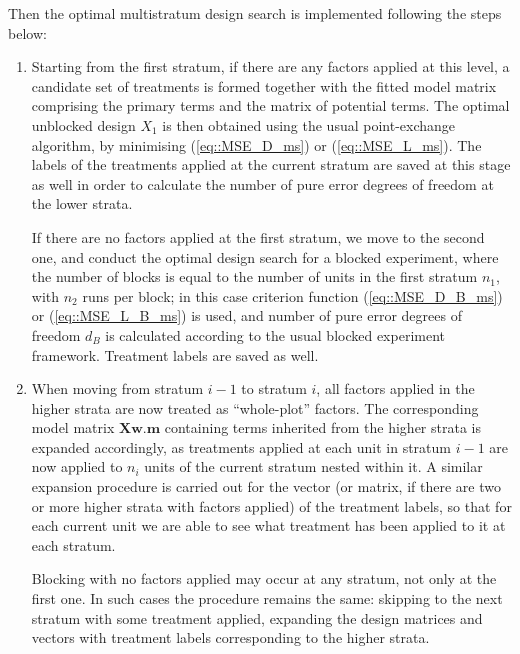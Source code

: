 
Then the optimal multistratum design search is implemented following the steps below:
\begin{enumerate}
\item Starting from the first stratum, if there are any factors applied at this level, a candidate set of treatments is formed together with the fitted model matrix comprising the primary terms and the matrix of potential terms. The optimal unblocked design $X_1$ is then obtained using the usual point-exchange algorithm, by minimising (\ref{eq::MSE_D_ms}) or (\ref{eq::MSE_L_ms}). The labels of the treatments applied at the current stratum are saved at this stage as well in order to calculate the number of pure error degrees of freedom at the lower strata.

If there are no factors applied at the first stratum, we move to the second one, and conduct the optimal design search for a blocked experiment, where the number of blocks is equal to the number of units in the first stratum $n_1$, with $n_2$ runs per block; in this case criterion function (\ref{eq::MSE_D_B_ms}) or (\ref{eq::MSE_L_B_ms}) is used, and number of pure error degrees of freedom $d_B$ is calculated according to the usual blocked experiment framework. Treatment labels are saved as well. 
 
\item When moving from stratum $i-1$ to stratum $i$, all factors applied in the higher strata are now treated as ``whole-plot'' factors. The corresponding model matrix $\bm{Xw.m}$ containing terms inherited from the higher strata is expanded accordingly, as treatments applied at each unit in stratum $i-1$ are now applied to $n_i$ units of the current stratum nested within it. A similar expansion procedure is carried out for the vector (or matrix, if there are two or more higher strata with factors applied) of the treatment labels, so that for each current unit we are able to see what treatment has been applied to it at each stratum.

Blocking with no factors applied may occur at any stratum, not only at the first one. In such cases the procedure remains the same: skipping to the next stratum with some treatment applied, expanding the design matrices and vectors with treatment labels corresponding to the higher strata.


\end{enumerate}
